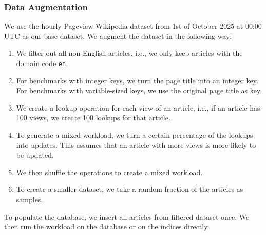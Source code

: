 \subsubsection*{Data Augmentation}
We use the hourly Pageview Wikipedia dataset from 1st of October 2025 at 00:00 UTC as our base dataset.
We augment the dataset in the following way:
\begin{enumerate}
    \item We filter out all non-English articles, i.e., we only keep articles with the domain code \texttt{en}.
    \item For benchmarks with integer keys, we turn the page title into an integer key. For benchmarks with variable-sized keys, we use the original page title as key.
    \item We create a lookup operation for each view of an article, i.e., if an article has 100 views, we create 100 lookups for that article.
    \item To generate a mixed workload, we turn a certain percentage of the lookups into updates. This assumes that an article with more views is more likely to be updated.
    \item We then shuffle the operations to create a mixed workload.
    \item To create a smaller dataset, we take a random fraction of the articles as samples.
\end{enumerate}

To populate the database, we insert all articles from filtered dataset once.
We then run the workload on the database or on the indices directly.

